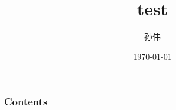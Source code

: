 \documentclass[CJK]{beamer}
\begin{document}
\begin{CJK*}{UTF8}{gbsn}

  \title{test}
  \author{孙伟}
  \date{\today}
  \begin{frame} 
    \titlepage
  \end{frame}
  \begin{frame} \frametitle{Contents}
    \tableofcontents
  \end{frame}

\end{CJK*}
\end{document}
